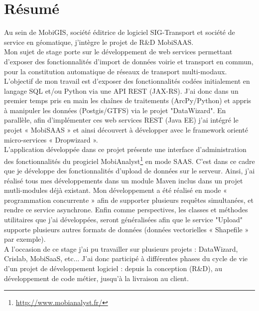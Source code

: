 \chapter*{Résumé}\label{Resume}

Au sein de MobiGIS, société éditrice de logiciel SIG-Transport et société de service en géomatique, j'intègre le projet de R\&D MobiSAAS.\\

Mon sujet de stage porte sur le développement de web services permettant d’exposer des fonctionnalités d’import de données voirie et transport en commun, pour la constitution automatique de réseaux de transport multi-modaux. \\

L'objectif de mon travail est d'exposer des fonctionnalités codées initialement en langage SQL et/ou Python via une API REST (JAX-RS). J'ai donc dans un premier temps pris en main les chaînes de traitements (ArcPy/Python) et appris à manipuler les données (Postgis/GTFS) via le projet "DataWizard". En parallèle, afin d'implémenter ces web services REST (Java EE) j'ai intégré le projet « MobiSAAS » et ainsi découvert à développer avec le framework orienté micro-services « Dropwizard ». \\

L'application développée dans ce projet présente une interface d'administration des fonctionnalités du progiciel MobiAnalyst\footnote{\url{http://www.mobianalyst.fr/}} en mode SAAS. C'est dans ce cadre que je développe des fonctionnalités d'upload de données sur le serveur. Ainsi, j'ai réalisé tous mes développements dans un module Maven inclus dans un projet mutli-modules déjà existant. Mon développement a été réalisé en mode « programmation concurrente » afin de supporter plusieurs requêtes simultanées, et rendre ce service asynchrone. Enfin comme perspectives, les classes et méthodes utilitaires que j'ai développées, seront généralisées afin que le service "Upload" supporte plusieurs autres formats de données (données vectorielles « Shapefile » par exemple).\\

A l'occasion de ce stage j'ai pu travailler sur plusieurs projets : DataWizard,  Crislab,  MobiSaaS, etc... J'ai donc participé à différentes phases du cycle de vie d'un projet de développement logiciel : depuis la conception (R\&D), au développement de code métier, jusqu'à la livraison au client.\\